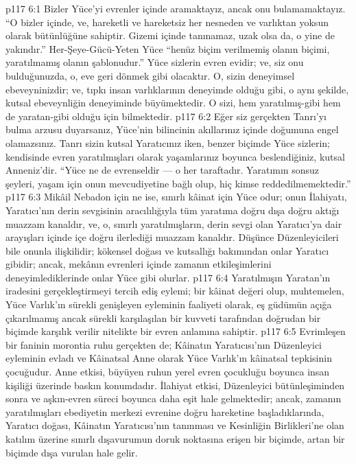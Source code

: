\vs p117 6:1 Bizler Yüce’yi evrenler içinde aramaktayız, ancak onu bulamamaktayız. “O bizler içinde, ve, hareketli ve hareketsiz her nesneden ve varlıktan yoksun olarak bütünlüğüne sahiptir. Gizemi içinde tanınamaz, uzak olsa da, o yine de yakındır.” Her\hyp{}Şeye\hyp{}Gücü\hyp{}Yeten Yüce “henüz biçim verilmemiş olanın biçimi, yaratılmamış olanın şablonudur.” Yüce sizlerin evren evidir; ve, siz onu bulduğunuzda, o, eve geri dönmek gibi olacaktır. O, sizin deneyimsel ebeveyninizdir; ve, tıpkı insan varlıklarının deneyimde olduğu gibi, o aynı şekilde, kutsal ebeveynliğin deneyiminde büyümektedir. O sizi, hem yaratılmış\hyp{}gibi hem de yaratan\hyp{}gibi olduğu için bilmektedir.
\vs p117 6:2 Eğer siz gerçekten Tanrı’yı bulma arzusu duyarsanız, Yüce’nin bilincinin akıllarınız içinde doğumuna engel olamazsınız. Tanrı sizin kutsal Yaratıcınız iken, benzer biçimde Yüce sizlerin; kendisinde evren yaratılmışları olarak yaşamlarınız boyunca beslendiğiniz, kutsal Anneniz’dir. “Yüce ne de evrenseldir --- o her taraftadır. Yaratımın sonsuz şeyleri, yaşam için onun mevcudiyetine bağlı olup, hiç kimse reddedilmemektedir.”
\vs p117 6:3 Mikâil Nebadon için ne ise, sınırlı kâinat için Yüce odur; onun İlahiyatı, Yaratıcı’nın derin sevgisinin aracılılığıyla tüm yaratıma doğru dışa doğru aktığı muazzam kanaldır, ve, o, sınırlı yaratılmışların, derin sevgi olan Yaratıcı’ya dair arayışları içinde içe doğru ilerlediği muazzam kanaldır. Düşünce Düzenleyicileri bile onunla ilişkilidir; kökensel doğası ve kutsallığı bakımından onlar Yaratıcı gibidir; ancak, mekânın evrenleri içinde zamanın etkileşimlerini deneyimlediklerinde onlar Yüce gibi olurlar.
\vs p117 6:4 Yaratılmışın Yaratan’ın iradesini gerçekleştirmeyi tercih ediş eylemi; bir kâinat değeri olup, muhtemelen, Yüce Varlık’ın sürekli genişleyen eyleminin faaliyeti olarak, eş güdümün açığa çıkarılmamış ancak sürekli karşılaşılan bir kuvveti tarafından doğrudan bir biçimde karşılık verilir nitelikte bir evren anlamına sahiptir.
\vs p117 6:5 Evrimleşen bir faninin morontia ruhu gerçekten de; Kâinatın Yaratıcısı’nın Düzenleyici eyleminin evladı ve Kâinatsal Anne olarak Yüce Varlık’ın kâinatsal tepkisinin çocuğudur. Anne etkisi, büyüyen ruhun yerel evren çocukluğu boyunca insan kişiliği üzerinde baskın konumdadır. İlahiyat etkisi, Düzenleyici bütünleşiminden sonra ve aşkın\hyp{}evren süreci boyunca daha eşit hale gelmektedir; ancak, zamanın yaratılmışları ebediyetin merkezi evrenine doğru hareketine başladıklarında, Yaratıcı doğası, Kâinatın Yaratıcısı’nın tanınması ve Kesinliğin Birlikleri’ne olan katılım üzerine sınırlı dışavurumun doruk noktasına erişen bir biçimde, artan bir biçimde dışa vurulan hale gelir.
